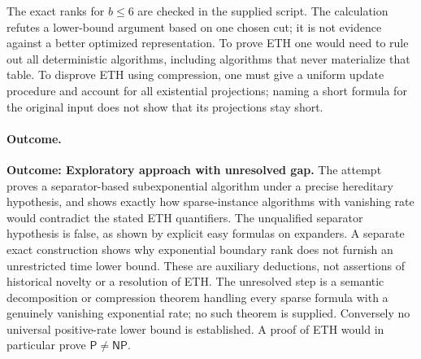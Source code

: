 \documentclass[11pt,a4paper]{article}
\numberwithin{equation}{section}
\begin{document}
The exact ranks for $b\le6$ are checked in the supplied script. The
calculation refutes a lower-bound argument based on one chosen cut; it
is not evidence against a better optimized representation. To prove ETH
one would need to rule out all deterministic algorithms, including
algorithms that never materialize that table. To disprove ETH using
compression, one must give a uniform update procedure and account for
all existential projections; naming a short formula for the original
input does not show that its projections stay short.

\paragraph{Outcome.}
\textbf{Outcome: Exploratory approach with unresolved gap.}
The attempt proves a separator-based subexponential algorithm under a
precise hereditary hypothesis, and shows exactly how sparse-instance
algorithms with vanishing rate would contradict the stated ETH
quantifiers. The unqualified separator hypothesis is false, as shown
by explicit easy formulas on expanders. A separate exact construction
shows why exponential boundary rank does not furnish an unrestricted
time lower bound. These are auxiliary deductions, not assertions of
historical novelty or a resolution of ETH. The unresolved step is a
semantic decomposition or compression theorem handling every sparse
formula with a genuinely vanishing exponential rate; no such theorem
is supplied. Conversely no universal positive-rate lower bound is
established. A proof of ETH would in particular prove $\mathsf P\ne\mathsf{NP}$.
\end{document}
